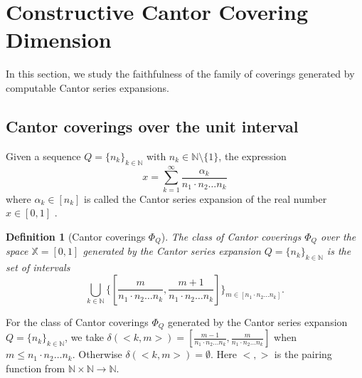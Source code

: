 \documentclass[11pt]{article}
\newtheorem{definition}{Definition}
\newcommand{\N}{\mathbb{N}}
\newcommand{\X}{{\mathbb{X}}}
\begin{document}
\section{Constructive Cantor Covering Dimension} \label{sec:CantorDim}
\label{sec:equivalenceoffaithfulness}



In this section, we study the faithfulness of the family of coverings generated by computable Cantor series expansions.

\subsection{ Cantor coverings over the unit interval } 



Given a sequence $Q = \{n_k\}_{k \in \N}$ with $n_k \in \N \setminus
\{1\}$, the expression
$$x = \sum_{k = 1}^\infty \frac{\alpha_k}{n_1 \cdot n_2 \dots n_k}$$ where
$\alpha_k \in [n_k]$ is called the Cantor series expansion of the real
number $x \in [0,1]$  \cite{Cantor1932}.


\begin{definition}[Cantor coverings $\Phi_Q$]
	The class of Cantor coverings $\Phi_Q$ over the space $\X = [0,1]$ generated by the Cantor series expansion $Q = \{n_k\}_{k \in \N}$  is the set of 
	intervals $$\bigcup_{{k \in \N}} \{[\frac{m}{n_1 \cdot n_2 \dots n_k},
	\frac{m+1}{ n_1 \cdot n_2 \dots n_k}]\}_{m \in [ n_1 \cdot n_2 \dots
		n_k]}.$$ 
\end{definition}

For the class of Cantor coverings $\Phi_Q$ generated by the Cantor series expansion $Q = \{n_k\}_{k \in \N}$, we take $\delta(<k,m>) = [\frac{m-1}{ n_1 \cdot n_2 \dots n_k},
\frac{m}{n_1 \cdot n_2 \dots n_k}]$  when $m \leq n_1 \cdot n_2 \dots
n_k$. Otherwise $\delta(<k,m>) = \emptyset$. Here $<,>$ is the pairing function from $\N \times \N \to \N$.
\end{document}

